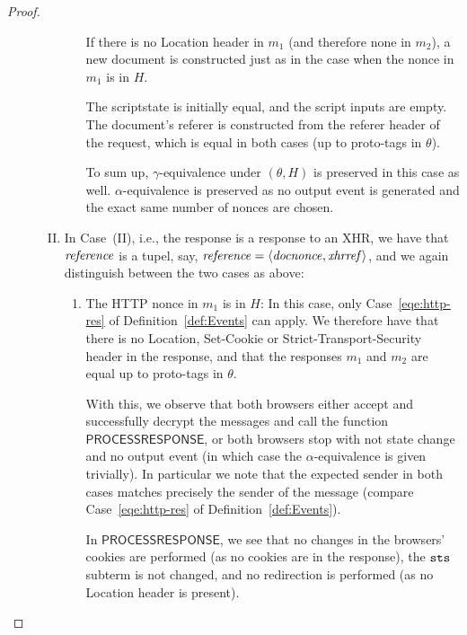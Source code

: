 \begin{proof}
\begin{description}
\begin{enumerate}[I.]
\begin{enumerate}
              If there is no Location header in $m_1$ (and therefore none in
              $m_2$), a new document is constructed just as in the case when
              the nonce in $m_1$ is in $H$.
      
              The scriptstate is initially equal, and the script inputs are
              empty. The document's referer is constructed from the referer
              header of the request, which is equal in both cases (up to
              proto-tags in $\theta$).
      
              To sum up, $\gamma$-equivalence under $(\theta, H)$ is
              preserved in this case as well. $\alpha$-equivalence is
              preserved as no output event is generated and the exact same
              number of nonces are chosen.
          \end{enumerate}
        \item\label{browser-http-response-xhr}
          In Case~(II), i.e., the response is a response to an XHR, 
          we have that $\mathit{reference}$ is a tupel, say,
          $\mathit{reference} = \langle\mathit{docnonce}, \mathit{xhrref}\rangle$, 
          and we again distinguish between the two cases as above:
          \begin{enumerate}
            \item The HTTP nonce in $m_1$ is in $H$: In this case, only
              Case~\ref{eqe:http-res} of Definition~\ref{def:Events}
              can apply. We therefore have that there is no Location,
              Set-Cookie or Strict-Transport-Security header in the
              response, and that the responses $m_1$ and $m_2$ are equal up
              to proto-tags in $\theta$.
      
              With this, we observe that both browsers either accept and
              successfully decrypt the messages and call the function
              $\mathsf{PROCESSRESPONSE}$, or both browsers stop with not
              state change and no output event (in which case the
              $\alpha$-equivalence is given trivially). In particular we
              note that the expected sender in both cases matches precisely
              the sender of the message (compare Case~\ref{eqe:http-res} of
              Definition~\ref{def:Events}).
      
              In $\mathsf{PROCESSRESPONSE}$, we see that no changes in the
              browsers' cookies are performed (as no cookies are in the
              response), the $\mathtt{sts}$ subterm is not changed, and no
              redirection is performed (as no Location header is present).
      

\end{enumerate}
\end{enumerate}
\end{description}
\end{proof}
